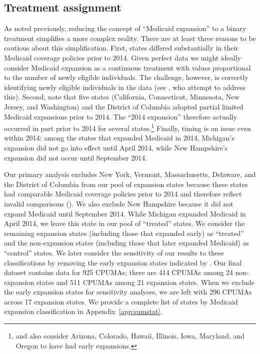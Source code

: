 \documentclass[aoas]{imsart}
\theoremstyle{plain}
\theoremstyle{remark}
\begin{document}
\subsection{Treatment assignment} \label{sssec:txassign}

As noted previously, reducing the concept of ``Medicaid expansion'' to a binary treatment simplifies a more complex reality. There are at least three reasons to be cautious about this simplification. First, states differed substantially in their Medicaid coverage policies prior to 2014. Given perfect data we might ideally consider Medicaid expansion as a continuous treatment with values proportional to the number of newly eligible individuals. The challenge, however, is correctly identifying newly eligible individuals in the data (see \cite{frean2017premium}, who attempt to address this). Second, \cite{frean2017premium} note that five states (California, Connecticut, Minnesota, New Jersey, and Washington) and the District of Columbia adopted partial limited Medicaid expansions prior to 2014. The ``2014 expansion'' therefore actually occurred in part prior to 2014 for several states.\footnote{\cite{kaestner2017effects} and \cite{courtemanche2017early} also consider Arizona, Colorado, Hawaii, Illinois, Iowa, Maryland, and Oregon to have had early expansions.} Finally, timing is an issue even within 2014: among the states that expanded Medicaid in 2014, Michigan's expansion did not go into effect until April 2014, while New Hampshire's expansion did not occur until September 2014.

Our primary analysis excludes New York, Vermont, Massachusetts, Delaware, and the District of Columbia from our pool of expansion states because these states had comparable Medicaid coverage policies prior to 2014 and therefore reflect invalid comparisons (\cite{kaestner2017effects}). We also exclude New Hampshire because it did not expand Medicaid until September 2014. While Michigan expanded Medicaid in April 2014, we leave this state in our pool of ``treated'' states. We consider the remaining expansion states (including those that expanded early) as ``treated'' and the non-expansion states (including those that later expanded Medicaid) as ``control'' states. We later consider the sensitivity of our results to these classifications by removing the early expansion states indicated by \cite{frean2017premium}. Our final dataset contains data for 925 CPUMAs; there are 414 CPUMAs among 24 non-expansion states and 511 CPUMAs among 21 expansion states. When we exclude the early expansion states for sensitivity analyses, we are left with 296 CPUMAs across 17 expansion states. We provide a complete list of states by Medicaid expansion classification in Appendix~\ref{app:sumstat}.
\end{document}
